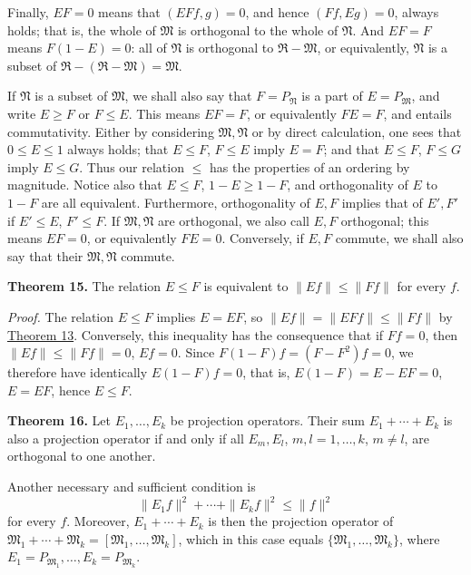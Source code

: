 \documentclass[fontsize=13pt,twoside,openany,headings=normal,parskip=false,bookmarkpackage=false,DIV=calc]{scrbook}
\begin{document}
Finally, $EF=0$ means that $(EFf,g)=0$, and hence $(Ff,Eg)=0$, always holds; that is, the whole of $\mathfrak{M}$ is orthogonal to the whole of $\mathfrak{N}$. And $EF=F$ means $F(1-E)=0$: all of $\mathfrak{N}$ is orthogonal to $\mathfrak{R}-\mathfrak{M}$, or equivalently, $\mathfrak{N}$ is a subset of $\mathfrak{R}-(\mathfrak{R}-\mathfrak{M})=\mathfrak{M}$.

If $\mathfrak{N}$ is a subset of $\mathfrak{M}$, we shall also say that $F=P_{\mathfrak{N}}$ is a part of $E=P_{\mathfrak{M}}$, and write $E\geq F$ or $F\leq E$. This means $EF=F$, or equivalently $FE=F$, and entails commutativity. Either by considering $\mathfrak{M},\mathfrak{N}$ or by direct calculation, one sees that $0\leq E\leq1$ always holds; that $E\leq F$, $F\leq E$ imply $E=F$; and that $E\leq F$, $F\leq G$ imply $E\leq G$. Thus our relation $\leq$ has the properties of an ordering by magnitude. Notice also that $E\leq F$, $1-E\geq1-F$, and orthogonality of $E$ to $1-F$ are all equivalent. Furthermore, orthogonality of $E,F$ implies that of $E',F'$ if $E'\leq E$, $F'\leq F$. If $\mathfrak{M},\mathfrak{N}$ are orthogonal, we also call $E,F$ orthogonal; this means $EF=0$, or equivalently $FE=0$. Conversely, if $E,F$ commute, we shall also say that their $\mathfrak{M},\mathfrak{N}$ commute.

\leavevmode{}\textbf{Theorem 15.}\label{thm:II.15} The relation $E\leq F$ is equivalent to $\|Ef\|\leq\|Ff\|$ for every $f$.

\emph{Proof.} The relation $E\leq F$ implies $E=EF$, so $\|Ef\|=\|EFf\|\leq\|Ff\|$ by \hyperref[thm:II.13]{Theorem 13}. Conversely, this inequality has the consequence that if $Ff=0$, then $\|Ef\|\leq\|Ff\|=0$, $Ef=0$. Since $F(1-F)f=(F-F^2)f=0$, we therefore have identically $E(1-F)f=0$, that is, $E(1-F)=E-EF=0$, $E=EF$, hence $E\leq F$.

\leavevmode{}\textbf{Theorem 16.}\label{thm:II.16} Let $E_1,\ldots,E_k$ be projection operators. Their sum $E_1+\cdots+E_k$ is also a projection operator if and only if all $E_m,E_l$, $m,l=1,\ldots,k$, $m\ne l$, are orthogonal to one another.

\hypertarget{origpage-45}{}%
Another necessary and sufficient condition is
\[
\|E_1f\|^2+\cdots+\|E_kf\|^2\leq\|f\|^2
\]
for every $f$. Moreover, $E_1+\cdots+E_k$ is then the projection operator of $\mathfrak{M}_1+\cdots+\mathfrak{M}_k=[\mathfrak{M}_1,\ldots,\mathfrak{M}_k]$, which in this case equals $\{\mathfrak{M}_1,\ldots,\mathfrak{M}_k\}$, where $E_1=P_{\mathfrak{M}_1},\ldots,E_k=P_{\mathfrak{M}_k}$.
\end{document}
